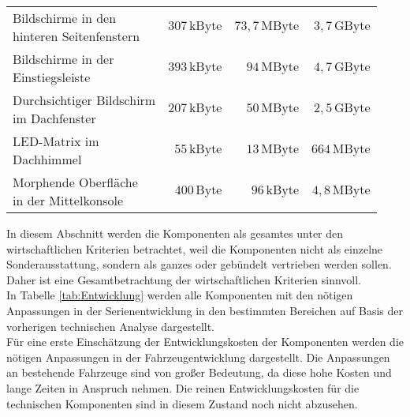 \begin{table}[hbt]
\begin{tabular}{l|rrr}
		\parbox[t]{0.3\linewidth}{\RaggedRight Bildschirme in den\\hinteren Seitenfenstern} & $ 307\,\mathrm{kByte} $ & $ 73,7\,\mathrm{MByte} $ & $ 3,7\,\mathrm{GByte} $ \\
		\parbox[t]{0.3\linewidth}{\RaggedRight Bildschirme in der\\ Einstiegsleiste} & $ 393\,\mathrm{kByte} $ & $ 94\,\mathrm{MByte} $ & $ 4,7\,\mathrm{GByte} $ \\
		\parbox[t]{0.3\linewidth}{\RaggedRight Durchsichtiger Bildschirm\\im Dachfenster} & $ 207\,\mathrm{kByte} $ & $ 50\,\mathrm{MByte} $ & $ 2,5\,\mathrm{GByte} $ \\
		\parbox[t]{0.3\linewidth}{\RaggedRight LED-Matrix im\\ Dachhimmel} & $ 55\,\mathrm{kByte} $ & $ 13\,\mathrm{MByte} $ & $ 664\,\mathrm{MByte} $ \\
		\parbox[t]{0.3\linewidth}{\RaggedRight Morphende Oberfläche\\in der Mittelkonsole} & $ 400\,\mathrm{Byte} $ & $ 96\,\mathrm{kByte} $ &$ 4,8\,\mathrm{MByte} $ \\
	\end{tabular} 
\end{table}
In diesem Abschnitt werden die Komponenten als gesamtes unter den wirtschaftlichen Kriterien betrachtet, weil die Komponenten nicht als einzelne Sonderausstattung, sondern als ganzes oder gebündelt vertrieben werden sollen. Daher ist eine Gesamtbetrachtung der wirtschaftlichen Kriterien sinnvoll. \\
In Tabelle \ref{tab:Entwicklung} werden alle Komponenten mit den nötigen Anpassungen in der Serienentwicklung in den bestimmten Bereichen auf Basis der vorherigen technischen Analyse dargestellt. \\
Für eine erste Einschätzung der Entwicklungskosten der Komponenten werden die nötigen Anpassungen in der Fahrzeugentwicklung dargestellt. Die Anpassungen an bestehende Fahrzeuge sind von großer Bedeutung, da diese hohe Kosten und lange Zeiten in Anspruch nehmen. Die reinen Entwicklungskosten für die technischen Komponenten sind in diesem Zustand noch nicht abzusehen.
